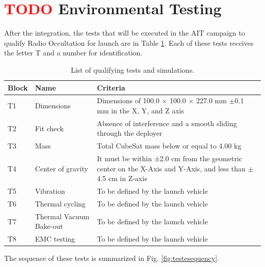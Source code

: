 \section{ \textcolor{red}{TODO} Environmental Testing}

After the integration, the tests that will be executed in the AIT campaign to qualify Radio Occultation for launch are in Table \ref{table_test}. Each of these tests receives the letter T and a number for identification. %

\begin{table}[!htb]
    \centering
    \begin{tabular}{lll}
        \toprule[1.5pt]
    	\textbf{Block} & \textbf{Name} & \textbf{Criteria} \\
    	\midrule
    	T1    & Dimensions                  & \parbox[t]{8cm}{Dimensions of 100.0 $\times$ 100.0 $\times$ 227.0 mm $\pm$0.1 mm in the X, Y, and Z axis} \\
        T2    & Fit check                   & \parbox[t]{8cm}{Absence of interference and a smooth sliding through the deployer} \\
    	T3    & Mass                        & Total CubeSat mass below or equal to 4.00 kg \\
    	T4    & Center of gravity           & \parbox[t]{8cm}{It must be within ±2.0 cm from the geometric center on the X-Axis and Y-Axis, and less than $\pm$4.5 cm in Z-axis} \\
        T5    & Vibration                   & To be defined by the launch vehicle \\
        T6    & Thermal cycling             & To be defined by the launch vehicle \\
        T7    & Thermal Vacuum Bake-out     & To be defined by the launch vehicle \\
        T8    & EMC testing                 & To be defined by the launch vehicle \\
        \bottomrule[1.5pt]
	\end{tabular}
    \caption{\label{table_test}List of qualifying tests and simulations.}
\end{table}

The sequence of these tests is summarized in Fig. \ref{fig:testesequency}.


